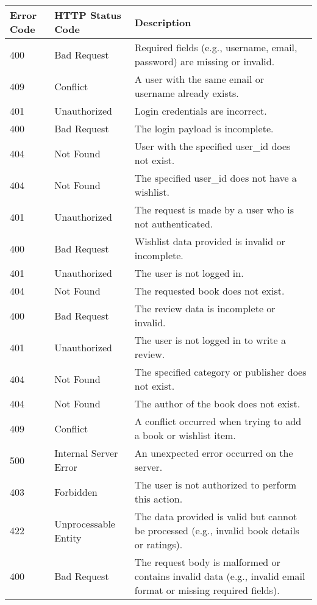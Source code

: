 \begin{longtable}{|p{}|p{} |p{}|} 
\hline
\textbf{Error Code} & \textbf{HTTP Status Code} & \textbf{Description} \\\hline


\hline 
400 & Bad Request & Required fields (e.g., username, email, password) are missing or invalid. \\
\hline 
409 & Conflict & A user with the same email or username already exists. \\
\hline 
401 & Unauthorized & Login credentials are incorrect. \\
\hline
400 & Bad Request & The login payload is incomplete. \\
\hline
404 & Not Found & User with the specified user\_id does not exist. \\
\hline
404 & Not Found & The specified user\_id does not have a wishlist. \\
\hline
401 & Unauthorized & The request is made by a user who is not authenticated. \\
\hline
400 & Bad Request & Wishlist data provided is invalid or incomplete. \\
\hline
401 & Unauthorized & The user is not logged in. \\
\hline
404 & Not Found & The requested book does not exist. \\
\hline
400 & Bad Request & The review data is incomplete or invalid. \\
\hline
401 & Unauthorized & The user is not logged in to write a review. \\
\hline
404 & Not Found & The specified category or publisher does not exist. \\
\hline
404 & Not Found & The author of the book does not exist. \\
\hline
409 & Conflict & A conflict occurred when trying to add a book or wishlist item. \\
\hline
500 & Internal Server Error & An unexpected error occurred on the server. \\
\hline
403 & Forbidden & The user is not authorized to perform this action. \\
\hline
422 & Unprocessable Entity & The data provided is valid but cannot be processed (e.g., invalid book details or ratings). \\
\hline
400 & Bad Request & The request body is malformed or contains invalid data (e.g., invalid email format or missing required fields). \\

\end{longtable}
